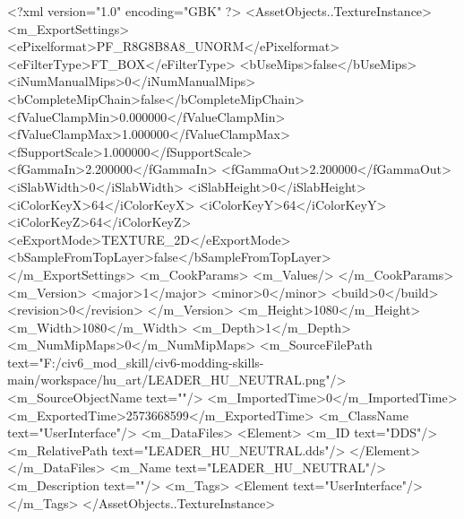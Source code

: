 <?xml version="1.0" encoding="GBK" ?>
<AssetObjects..TextureInstance>
	<m_ExportSettings>
		<ePixelformat>PF_R8G8B8A8_UNORM</ePixelformat>
		<eFilterType>FT_BOX</eFilterType>
		<bUseMips>false</bUseMips>
		<iNumManualMips>0</iNumManualMips>
		<bCompleteMipChain>false</bCompleteMipChain>
		<fValueClampMin>0.000000</fValueClampMin>
		<fValueClampMax>1.000000</fValueClampMax>
		<fSupportScale>1.000000</fSupportScale>
		<fGammaIn>2.200000</fGammaIn>
		<fGammaOut>2.200000</fGammaOut>
		<iSlabWidth>0</iSlabWidth>
		<iSlabHeight>0</iSlabHeight>
		<iColorKeyX>64</iColorKeyX>
		<iColorKeyY>64</iColorKeyY>
		<iColorKeyZ>64</iColorKeyZ>
		<eExportMode>TEXTURE_2D</eExportMode>
		<bSampleFromTopLayer>false</bSampleFromTopLayer>
	</m_ExportSettings>
	<m_CookParams>
		<m_Values/>
	</m_CookParams>
	<m_Version>
		<major>1</major>
		<minor>0</minor>
		<build>0</build>
		<revision>0</revision>
	</m_Version>
	<m_Height>1080</m_Height>
	<m_Width>1080</m_Width>
	<m_Depth>1</m_Depth>
	<m_NumMipMaps>0</m_NumMipMaps>
	<m_SourceFilePath text="F:/civ6_mod_skill/civ6-modding-skills-main/workspace/hu_art/LEADER_HU_NEUTRAL.png"/>
	<m_SourceObjectName text=""/>
	<m_ImportedTime>0</m_ImportedTime>
	<m_ExportedTime>2573668599</m_ExportedTime>
	<m_ClassName text="UserInterface"/>
	<m_DataFiles>
		<Element>
			<m_ID text="DDS"/>
			<m_RelativePath text="LEADER_HU_NEUTRAL.dds"/>
		</Element>
	</m_DataFiles>
	<m_Name text="LEADER_HU_NEUTRAL"/>
	<m_Description text=""/>
	<m_Tags>
		<Element text="UserInterface"/>
	</m_Tags>
</AssetObjects..TextureInstance>
